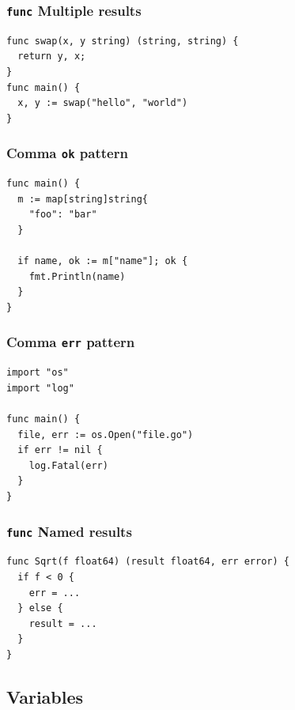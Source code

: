 \documentclass[xetex,mathserif,serif,12pt]{beamer}
\begin{document}
\begin{frame}[fragile]
  \frametitle{\texttt{func} Multiple results}

  \begin{beamer@nomargin}
    \begin{lstlisting}
func swap(x, y string) (string, string) {
  return y, x;
}
func main() {
  x, y := swap("hello", "world")
}
    \end{lstlisting}
  \end{beamer@nomargin}
\end{frame}

\begin{frame}[fragile]
  \frametitle{Comma \texttt{ok} pattern}

  \begin{beamer@nomargin}
    \begin{lstlisting}
func main() {
  m := map[string]string{
    "foo": "bar"
  }

  if name, ok := m["name"]; ok {
    fmt.Println(name)  
  }
}
    \end{lstlisting}
  \end{beamer@nomargin}
\end{frame}

\begin{frame}[fragile]
  \frametitle{Comma \texttt{err} pattern}

  \begin{beamer@nomargin}
    \begin{lstlisting}
import "os"
import "log"

func main() {
  file, err := os.Open("file.go")
  if err != nil {
    log.Fatal(err)
  }
}
    \end{lstlisting}
  \end{beamer@nomargin}
\end{frame}


\begin{frame}[fragile]
  \frametitle{\texttt{func} Named results}

  \begin{beamer@nomargin}
    \begin{lstlisting}
func Sqrt(f float64) (result float64, err error) {
  if f < 0 {
    err = ...
  } else {
    result = ...
  }
}
    \end{lstlisting}
  \end{beamer@nomargin}
\end{frame}

\subsection{Variables}
\end{document}
